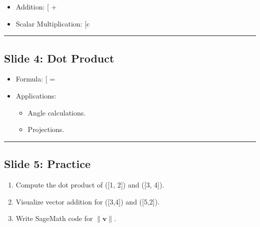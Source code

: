 \documentclass[
]{article}
\providecommand{\tightlist}{%
  \setlength{\itemsep}{0pt}\setlength{\parskip}{0pt}}
\begin{document}
\begin{itemize}
	\tightlist
	\item
	      Addition: {[} + 
	      \rightarrow \text{Tip-to-Tail Rule.}{]}
	\item
	      Scalar Multiplication: {[}c\cdot {}
	      \rightarrow \text{Scaling vector magnitude.}{]}
\end{itemize}

\begin{center}\rule{0.5\linewidth}{0.5pt}\end{center}

\hypertarget{slide-4-dot-product}{%
	\subsection{Slide 4: Dot Product}\label{slide-4-dot-product}}

\begin{itemize}
	\tightlist
	\item
	      Formula: {[} \cdot {} =
	      \textbar{}\textbar{} \textbar{}\textbar{}
	      \cos\theta{]}
	\item
	      Applications:

	      \begin{itemize}
		      \tightlist
		      \item
		            Angle calculations.
		      \item
		            Projections.
	      \end{itemize}
\end{itemize}

\begin{center}\rule{0.5\linewidth}{0.5pt}\end{center}

\hypertarget{slide-5-practice}{%
	\subsection{Slide 5: Practice}\label{slide-5-practice}}

\begin{enumerate}
	\def\labelenumi{\arabic{enumi}.}
	\tightlist
	\item
	      Compute the dot product of ({[}1, 2{]}) and ({[}3, 4{]}).
	\item
	      Visualize vector addition for ({[}3,4{]}) and ({[}5,2{]}).
	\item
	      Write SageMath code for \(\| \mathbf{v} \|\).
\end{enumerate}
\end{document}
